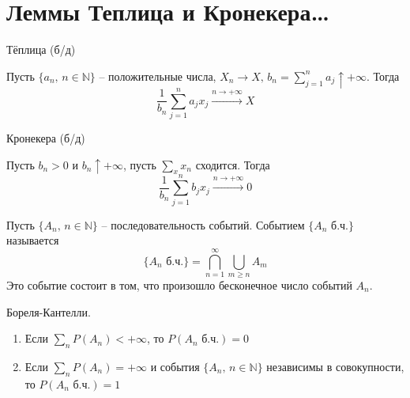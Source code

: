 \section{Леммы Теплица и Кронекера\dots}
\begin{lemma}
	Тёплица (б/д)

	Пусть $\{a_n,\, n \in \mathbb{N}\}$ -- положительные числа, $X_n \to X,\, b_n = \sum_{j = 1}^n a_j  \uparrow +\infty$. Тогда
	\[\frac{1}{b_n}\sum_{j = 1}^n a_jx_j \stackrel{n \to +\infty}{\to} X\]
\end{lemma}

\begin{lemma}
	Кронекера (б/д)

	Пусть $b_n > 0$ и $b_n \uparrow +\infty$, пусть $\sum_x x_n$ сходится. Тогда
	\[\frac{1}{b_n}\sum_{j = 1}^n b_jx_j \stackrel{n \to +\infty}{\to} 0\]
\end{lemma}

\begin{definition}
	Пусть $\{A_n,\, n \in \mathbb{N}\}$ -- последовательность событий. Событием $\{A_n \text{ б.ч.}\}$ называется
	\[\{A_n \text{ б.ч.}\} = \bigcap_{n = 1}^\infty \bigcup_{m \geq n} A_m\]
	Это событие состоит в том, что произошло бесконечное число событий $A_n$.
\end{definition}

\begin{lemma}
	Бореля-Кантелли.

	\begin{enumerate}
		\item Если $\sum_n P(A_n) < +\infty$, то $P(A_n \text{ б.ч.}) = 0$
		\item Если $\sum_n P(A_n) = +\infty$ и события $\{A_n,\, n \in \mathbb{N}\}$ независимы в совокупности, то $P(A_n \text{ б.ч.}) = 1$
	\end{enumerate}
\end{lemma}

